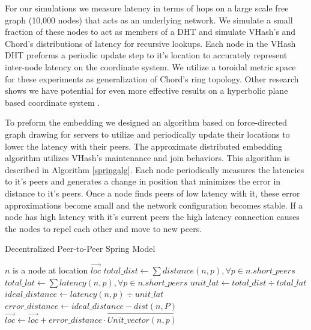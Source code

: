 \documentclass{IEEEtran}
\begin{document}
For our simulations we measure latency in terms of hops on a large scale free graph (10,000 nodes) that acts as an underlying network.
We simulate a small fraction of these nodes to act as members of a DHT and simulate VHash's and Chord's distributions of latency for recursive lookups.
Each node in the VHash DHT preforms a periodic update step to it's location to accurately represent inter-node latency on the coordinate system.
We utilize a toroidal metric space for these experiments as generalization of Chord's ring topology.
Other research shows we have potential for even more effective results on a hyperbolic plane based coordinate system \cite{papadopoulos2010greedy}.

To preform the embedding we designed an algorithm based on force-directed graph drawing \cite{Spring} for servers to utilize and periodically update their locations to lower the latency with their peers.
The approximate distributed embedding algorithm utilizes VHash's maintenance and join behaviors.
This algorithm is described in Algorithm \ref{springalg}. Each node periodically measures the latencies to it's peers and generates a change in position that minimizes the error in distance to it's peers.
Once a node finds peers of low latency with it, these error approximations become small and the network configuration becomes stable.
If a node has high latency with it's current peers the high latency connection causes the nodes to repel each other and move to new peers.

\begin{algorithm}
\caption{Decentralized Peer-to-Peer Spring Model}
\label{springalg}
\begin{algorithmic}[1] 
	\STATE $n$ is a node at location $\overrightarrow{loc}$
    \STATE $total\_dist \leftarrow \sum distance(n,p),\forall p \in n.short\_peers$
    \STATE $total\_lat \leftarrow \sum latency(n,p),\forall p \in n.short\_peers$
    \STATE $unit\_lat \leftarrow total\_dist \div total\_lat$
    	\STATE $ideal\_distance \leftarrow latency(n,p) \div unit\_lat$
        \STATE $error\_distance \leftarrow ideal\_distance - dist(n,P)$
        \STATE $\overrightarrow{loc} \leftarrow \overrightarrow{loc} + error\_distance \cdot \overrightarrow{Unit\_vector(n,p)} $
    \ENDFOR
\end{algorithmic}
\end{algorithm}
\end{document}
